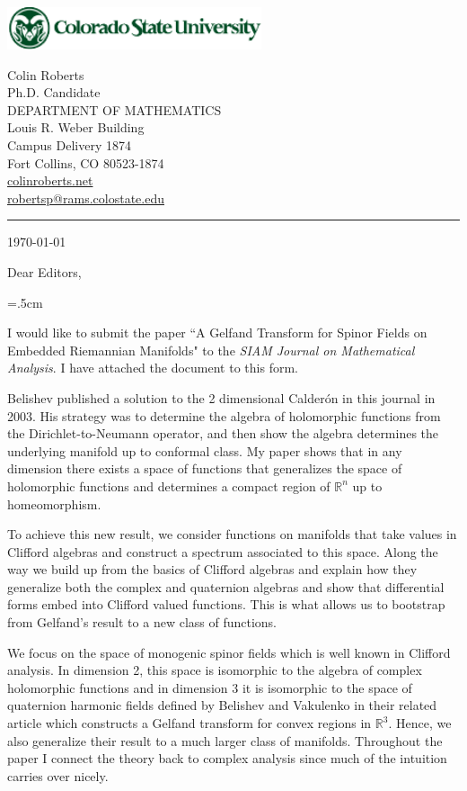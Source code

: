 \documentclass[12pt]{amsart}
\begin{document}
\noindent\includegraphics[width=7.5cm]{csuwrdmrk357.pdf}\\
{\begin{spacing}{0.95}\sf\footnotesize
 Colin Roberts\\
 Ph.D. Candidate\\
{\color{csugreen}DEPARTMENT OF MATHEMATICS}\\
Louis R. Weber Building\\
Campus Delivery 1874\\
Fort Collins, CO 80523-1874\\
\url{colinroberts.net}\\
\url{robertsp@rams.colostate.edu}\\
\end{spacing}
}
\smallskip
{\color{csugreen}\rule{12mm}{0.8mm}}\medskip

\today
\bigskip


\noindent Dear Editors,
\bigskip

\parindent=.5cm

I would like to submit the paper ``A Gelfand Transform for Spinor Fields on Embedded Riemannian Manifolds" to the \emph{SIAM Journal on Mathematical Analysis}. I have attached the document to this form. 

Belishev published a solution to the 2 dimensional Calder\'on in this journal in 2003. His strategy was to determine the algebra of holomorphic functions from the Dirichlet-to-Neumann operator, and then show the algebra determines the underlying manifold up to conformal class. My paper shows that in any dimension there exists a space of functions that generalizes the space of holomorphic functions and determines a compact region of $\mathbb{R}^n$ up to homeomorphism. 

To achieve this new result, we consider functions on manifolds that take values in Clifford algebras and construct a spectrum associated to this space. Along the way we build up from the basics of Clifford algebras and explain how they generalize both the complex and quaternion algebras and show that differential forms embed into Clifford valued functions. This is what allows us to bootstrap from Gelfand's result to a new class of functions.

We focus on the space of monogenic spinor fields which is well known in Clifford analysis. In dimension 2, this space is isomorphic to the algebra of complex holomorphic functions and in dimension 3 it is isomorphic to the space of quaternion harmonic fields defined by Belishev and Vakulenko in their related article which constructs a Gelfand transform for convex regions in $\mathbb{R}^3$. Hence, we also generalize their result to a much larger class of manifolds. Throughout the paper I connect the theory back to complex analysis since much of the intuition carries over nicely. 
\end{document}
